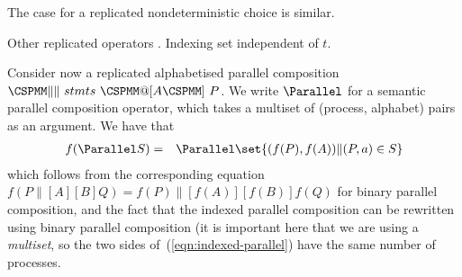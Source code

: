 %

The case for a replicated nondeterministic choice is similar.  

Other replicated operators \framebox{**}.  Indexing set independent of $t$. 


Consider now a replicated alphabetised parallel composition $\M{\|\|} ~ stmts
~ \M{@ [} A \M{]}~ P$.  We write $\Parallel$ for a semantic parallel
composition operator, which takes a multiset of (process, alphabet) pairs as an
argument.   We have that
\begin{eqnarray}
\label{eqn:indexed-parallel}
f(\Parallel S) & = & \Parallel \set{(f(P), f(A)) \| (P,a) \in S}
\end{eqnarray}
which follows from the corresponding equation $f(P \parallel[A][B] Q) =
f(P) \parallel[f(A)][f(B)] f(Q)$ for binary parallel composition, and the fact
that the indexed parallel composition can be rewritten using binary parallel
composition (it is important here that we are using a \emph{multiset}, so the
two sides of~(\ref{eqn:indexed-parallel}) have the same number of processes.


